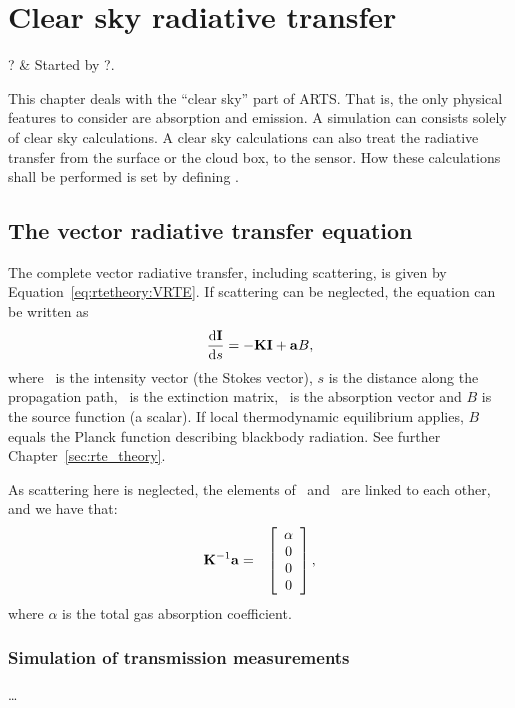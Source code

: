 \chapter{Clear sky radiative transfer}
 \label{sec:rte}


\starthistory
  ? & Started by ?. \\
\stophistory


This chapter deals with the ``clear sky'' part of ARTS. That is, the
only physical features to consider are absorption and emission. A
simulation can consists solely of clear sky calculations. A clear sky
calculations can also treat the radiative transfer from the surface or
the cloud box, to the sensor. How these calculations shall be
performed is set by defining . 


\section{The vector radiative transfer equation}
\label{sec:rte:vrte}

The complete vector radiative transfer, including scattering, is given
by Equation~\ref{eq:rtetheory:VRTE}. If scattering can be neglected,
the equation can be written as
\begin{equation}
  \label{eq:rte:vrte}
  \frac {\mathrm{d}{\bf I}}{\mathrm{d} s} = -{\bf K}{\bf I} + {\bf a} B,
\end{equation}
where \StoVec\ is the intensity vector (the Stokes vector), $s$ is the
distance along the propagation path, \ExtMat\ is the extinction
matrix, \AbsVec\ is the absorption vector and $B$ is the source
function (a scalar). If local thermodynamic equilibrium applies, $B$
equals the Planck function describing blackbody radiation. See further
Chapter~\ref{sec:rte_theory}.

As scattering here is neglected, the elements of \ExtMat\ and \AbsVec\ 
are linked to each other, and we have that:
\begin{eqnarray*}
  {\bf K}^{-1}{\bf a} &=& \left[\begin{array}{c} \alpha\\0\\0\\0 \end{array}\right],
\end{eqnarray*}
where $\alpha$ is the total gas absorption coefficient. 


\subsection{Simulation of transmission measurements}
\label{sec:rte:trans_sim}

\dots


